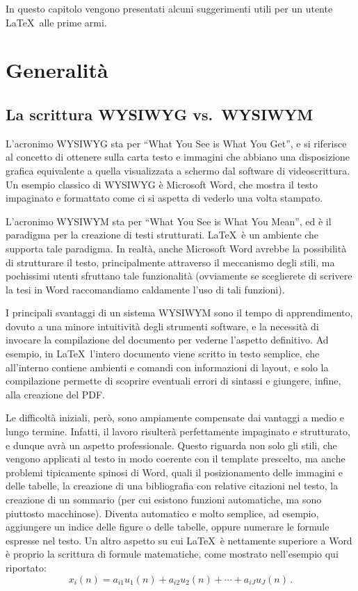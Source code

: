 \documentclass[12pt]{report}
\begin{document}
In questo capitolo vengono presentati alcuni suggerimenti utili per un utente \LaTeX\ alle prime armi.


\section{Generalit\`a}

\subsection{La scrittura WYSIWYG vs.\ WYSIWYM}

L'acronimo WYSIWYG sta per ``What You See is What You Get'', e si riferisce al concetto di ottenere sulla carta testo e immagini che abbiano una disposizione grafica equivalente a quella visualizzata a schermo dal software di videoscrittura. Un esempio classico di WYSIWYG è Microsoft Word, che mostra il testo impaginato e formattato come ci si aspetta di vederlo una volta stampato.

L'acronimo WYSIWYM sta per ``What You See is What You Mean'', ed è il paradigma per la creazione di testi strutturati. \LaTeX\ è un ambiente che supporta tale paradigma. In realtà, anche Microsoft Word avrebbe la possibilità di strutturare il testo, principalmente attraverso il meccanismo degli stili, ma pochissimi utenti sfruttano tale funzionalità (ovviamente se sceglierete di scrivere la tesi in Word raccomandiamo caldamente l'uso di tali funzioni).

I principali svantaggi di un sistema WYSIWYM sono il tempo di apprendimento, dovuto a una minore intuitività degli strumenti software, e la necessità di invocare la compilazione del documento per vederne l'aspetto definitivo. Ad esempio, in \LaTeX\ l'intero documento viene scritto in testo semplice, che all'interno contiene ambienti e comandi con informazioni di layout, e solo la compilazione permette di scoprire eventuali errori di sintassi e giungere, infine, alla creazione del PDF.

Le difficoltà iniziali, però, sono ampiamente compensate dai vantaggi a medio e lungo termine. Infatti, il lavoro risulterà perfettamente impaginato e strutturato, e dunque avrà un aspetto professionale. Questo riguarda non solo gli stili, che vengono applicati al testo in modo coerente con il template prescelto, ma anche problemi tipicamente spinosi di Word, quali il posizionamento delle immagini e delle tabelle, la creazione di una bibliografia con relative citazioni nel testo, la creazione di un sommario (per cui esistono funzioni automatiche, ma sono piuttosto macchinose). Diventa automatico e molto semplice, ad esempio, aggiungere un indice delle figure o delle tabelle, oppure numerare le formule espresse nel testo. Un altro aspetto su cui \LaTeX\ è nettamente superiore a Word è proprio la scrittura di formule matematiche, come mostrato nell'esempio qui riportato:
\begin{equation}
x_i(n) = a_{i1}u_1(n) + a_{i2}u_2(n) + \cdots + a_{iJ}u_J(n) \, .
\label{eq:multimix}
\end{equation}
\end{document}
